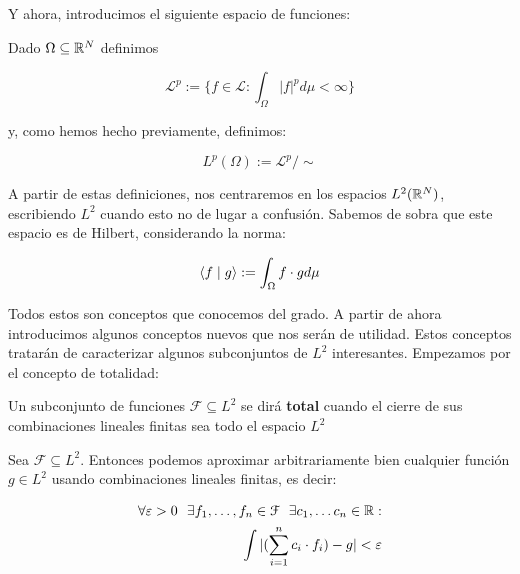 Y ahora, introducimos el siguiente espacio de funciones:

\begin{definicion}
    Dado $\Omega \subseteq \mathbb{R}^N$ definimos

    \begin{equation}
        \mathcal{L}^p := \{ f \in \mathcal{L} : \int_{\Omega} |f|^p d\mu < \infty \}
    \end{equation}

    y, como hemos hecho previamente, definimos:

    \begin{equation}
        L^p(\Omega) := \mathcal{L}^p / \sim
    \end{equation}

\end{definicion}

A partir de estas definiciones, nos centraremos en los espacios $L^2(\mathbb{R}^N)$, escribiendo $L^2$ cuando esto no de lugar a confusión. Sabemos de sobra que este espacio es de Hilbert, considerando la norma:

\begin{equation}
    \langle f \; | \; g \rangle := \int_{\Omega} f \cdot g d\mu
\end{equation}

Todos estos son conceptos que conocemos del grado. A partir de ahora introducimos algunos conceptos nuevos que nos serán de utilidad. Estos conceptos tratarán de caracterizar algunos subconjuntos de $L^2$ interesantes. Empezamos por el concepto de totalidad:

\begin{definicion}
    Un subconjunto de funciones $\mathcal{F} \subseteq L^2$ se dirá \textbf{total} cuando el cierre de sus combinaciones lineales finitas sea todo el espacio $L^2$
\end{definicion}

\begin{proposicion}
    Sea $\mathcal{F} \subseteq L^2$. Entonces podemos aproximar arbitrariamente bien cualquier función $g \in L^2$ usando combinaciones lineales finitas, es decir:

    \begin{equation}
    \begin{split}
        \forall \varepsilon > 0 \ \  \exists f_1, \ldots, f_n \in \mathcal{F} \ \  \exists c_1, \ldots c_n \in \mathbb{R}:\\
        \int | (\sum_{i = 1}^n c_i \cdot f_i) - g| < \varepsilon \\
    \end{split}
    \end{equation}

\end{proposicion}


